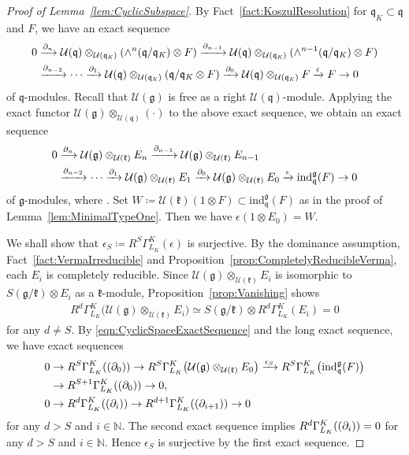 \documentclass[11pt]{article}
\numberwithin{equation}{section}
\numberwithin{equation}{section}
\theoremstyle{definition}
\newcommand{\BasicRing}[1]{\mathbb{#1}}
\newcommand{\NN}{\BasicRing{N}}
\newcommand{\lieC}[1]{\mathfrak{#1}}
\newcommand{\lie}[1]{\mathfrak{#1}}
\newcommand{\univ}[1]{\mathcal{U}(\lieC{#1})}
\newcommand{\ind}[2]{\mathrm{ind}^{\lieC{#1}}_{\lieC{#2}}}
\newcommand{\zuck}[2]{\Gamma^{#1}_{#2}}
\newcommand{\Dzuck}[3]{R^{#3}\zuck{#1}{#2}}
\let\Im\relax
\DeclareMathOperator{\Im}{\mathrm{Im}}
\begin{document}
\begin{proof}[Proof of Lemma~\ref{lem:CyclicSubspace}]
	By Fact~\ref{fact:KoszulResolution} for $\lie{q}_K\subset \lie{q}$ and $F$, we have an exact sequence
	\begin{align*}
0&\xrightarrow{\del_n} \univ{q}\otimes_{\univ{q_\mathit{K}}}(\wedge^n (\lie{q/q_\mathit{K}})\otimes F)
		\xrightarrow{\del_{n-1}} \univ{q}\otimes_{\univ{q_\mathit{K}}}(\wedge^{n-1} (\lie{q/q_\mathit{K}})\otimes F)\\
		& \xrightarrow{\del_{n-2}} \cdots \xrightarrow{\del_{1}} \univ{q}\otimes_{\univ{q_\mathit{K}}}(\lie{q/q_\mathit{K}}\otimes F)
		\xrightarrow{\del_{0}} \univ{q}\otimes_{\univ{q_\mathit{K}}}F
		\xrightarrow{\epsilon} F \rightarrow 0
	\end{align*}
	of $\lie{q}$-modules.
	Recall that $\univ{g}$ is free as a right $\univ{q}$-module.
	Applying the exact functor $\univ{g}\otimes_{\univ{q}}(\cdot)$
	to the above exact sequence, we obtain an exact sequence
	\begin{align}
0&\xrightarrow{\del_n} \univ{g}\otimes_{\univ{k}}E_n
		\xrightarrow{\del_{n-1}} \univ{g}\otimes_{\univ{k}}E_{n-1} \nonumber\\
		& \xrightarrow{\del_{n-2}} \cdots \xrightarrow{\del_{1}} \univ{g}\otimes_{\univ{k}}E_1
		\xrightarrow{\del_{0}} \univ{g}\otimes_{\univ{k}}E_0
		\xrightarrow{\epsilon} \ind{g}{q}(F) \rightarrow 0 \label{eqn:CyclicSpaceExactSequence}
	\end{align}
	of $\lie{g}$-modules, where \smash{$E_i\coloneq\ind{k}{q_\mathit{K}}\bigl(\wedge^i (\lie{q/q_\mathit{K}})\otimes F\bigr)$}.
	Set $W \coloneq \univ{k}(1\otimes F) \subset \ind{g}{q}(F)$ as in the proof of Lemma~\ref{lem:MinimalTypeOne}.
	Then we have $\epsilon(1\otimes E_0)=W$.

	We shall show that $\epsilon_S\coloneq \Dzuck{K}{L_K}{S}(\epsilon)$ is surjective.
	By the dominance assumption, Fact~\ref{fact:VermaIrreducible} and Proposition~\ref{prop:CompletelyReducibleVerma}, each $E_i$ is completely reducible.
	Since $\univ{g}\otimes_{\univ{k}}E_i$
	is isomorphic to $S(\lie{g}/\lie{k})\otimes E_i$ as a $\lie{k}$-module, Proposition~\ref{prop:Vanishing} shows
	\begin{align*}
		\Dzuck{K}{L_K}{d}\bigl(\univ{g}\otimes_{\univ{k}}E_i\bigr)
		\simeq S(\lie{g/k})\otimes \Dzuck{K}{L_K}{d}(E_i) = 0
	\end{align*}
	for any $d \neq S$.
	By \eqref{eqn:CyclicSpaceExactSequence} and the long exact sequence, we have exact sequences
	\begin{align*}
		&0 \rightarrow \Dzuck{K}{L_K}{S}(\Im(\del_0))\rightarrow \Dzuck{K}{L_K}{S}\bigl(\univ{g}\otimes_{\univ{k}}E_0\bigr)
		\xrightarrow{\epsilon_S} \Dzuck{K}{L_K}{S}\bigl(\ind{g}{q}(F)\bigr)\\
		& \hphantom{0} \rightarrow \Dzuck{K}{L_K}{S+1}(\Im(\del_0)) \rightarrow 0, \\
		&0 \rightarrow \Dzuck{K}{L_K}{d}(\Im(\del_{i})) \rightarrow \Dzuck{K}{L_K}{d+1}(\Im(\del_{i+1})) \rightarrow 0
	\end{align*}
	for any $d > S$ and $i \in \NN$.
	The second exact sequence implies $\Dzuck{K}{L_K}{d}(\Im(\del_{i}))=0$ for any $d > S$ and $i \in \NN$.
	Hence $\epsilon_S$ is surjective by the first exact sequence.


\end{proof}
\end{document}
